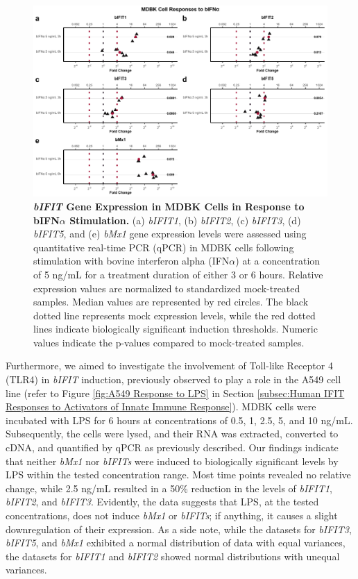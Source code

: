 \begin{figure}
    \centering
    \includegraphics[width=1\linewidth]{07. Chapter 2/Figs/02. Induction/01. mdbk_treat_bifna.pdf}
    \caption[\textit{bIFIT} Gene Expression in MDBK Cells in Response to bIFN\(\alpha\) Stimulation.]{\textbf{\textit{bIFIT} Gene Expression in MDBK Cells in Response to bIFN\(\alpha\) Stimulation.} (a) \textit{bIFIT1}, (b) \textit{bIFIT2}, (c) \textit{bIFIT3}, (d) \textit{bIFIT5}, and (e) \textit{bMx1} gene expression levels were assessed using quantitative real-time PCR (qPCR) in MDBK cells following stimulation with bovine interferon alpha (IFN\(\alpha\)) at a concentration of 5 ng/mL for a treatment duration of either 3 or 6 hours. Relative expression values are normalized to standardized mock-treated samples. Median values are represented by red circles. The black dotted line represents mock expression levels, while the red dotted lines indicate biologically significant induction thresholds. Numeric values indicate the p-values compared to mock-treated samples.}
    \label{fig:MDBK responses to bIFNa}
\end{figure}

Furthermore, we aimed to investigate the involvement of Toll-like Receptor 4 (TLR4) in \textit{bIFIT} induction, previously observed to play a role in the A549 cell line (refer to Figure \ref{fig:A549 Response to LPS} in Section \ref{subsec:Human IFIT Responses to Activators of Innate Immune Response}). MDBK cells were incubated with LPS for 6 hours at concentrations of 0.5, 1, 2.5, 5, and 10 ng/mL. Subsequently, the cells were lysed, and their RNA was extracted, converted to cDNA, and quantified by qPCR as previously described. Our findings indicate that neither \textit{bMx1} nor \textit{bIFITs} were induced to biologically significant levels by LPS within the tested concentration range. Most time points revealed no relative change, while 2.5 ng/mL resulted in a 50\% reduction in the levels of \textit{bIFIT1}, \textit{bIFIT2}, and \textit{bIFIT3}. Evidently, the data suggests that LPS, at the tested concentrations, does not induce \textit{bMx1} or \textit{bIFITs}; if anything, it causes a slight downregulation of their expression. As a side note, while the datasets for \textit{bIFIT3}, \textit{bIFIT5}, and \textit{bMx1} exhibited a normal distribution of data with equal variances, the datasets for \textit{bIFIT1} and \textit{bIFIT2} showed normal distributions with unequal variances.


